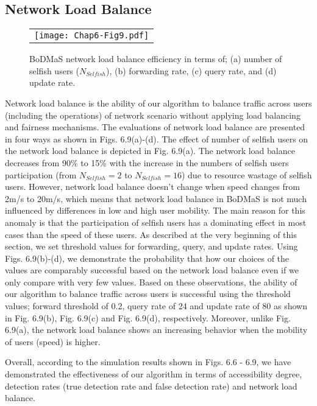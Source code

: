 \subsection{Network Load Balance}\label{Chap6_05_03}
\begin{figure}[t]
\begin{center}
  \begin{tabular}{c}
  \texttt{[image: Chap6-Fig9.pdf]}
  \end{tabular}
  \caption{BoDMaS network load balance efficiency in terms of; (a) number of selfish users ($N_{Selfish}$), (b) forwarding rate, (c) query rate, and (d) update rate.}
\end{center}
\end{figure}

Network load balance is the ability of our algorithm to balance traffic across users (including the operations) of network scenario without applying load balancing and fairness mechanisms. The evaluations of network load balance are presented in four ways as shown in Figs. 6.9(a)-(d). The effect of number of selfish users on the network load balance is depicted in Fig. 6.9(a). The network load balance decreases from 90\% to 15\% with the increase in the numbers of selfish users participation (from $N_{Selfish} = 2$ to $N_{Selfish}=16$) due to resource wastage of selfish users. However, network load balance doesn't change when speed changes from 2m/s to 20m/s, which means that network load balance in BoDMaS is not much influenced by differences in low and high user mobility. The main reason for this anomaly is that the participation of selfish users has a dominating effect in most cases than the speed of these users. As described at the very beginning of this section, we set threshold values for forwarding, query, and update rates. Using Figs. 6.9(b)-(d), we demonstrate the probability that how our choices of the values are comparably successful based on the network load balance even if we only compare with very few values. Based on these observations, the ability of our algorithm to balance traffic across users is successful using the threshold values; forward threshold of 0.2, query rate of 24 and update rate of 80 as shown in Fig. 6.9(b), Fig. 6.9(c) and Fig. 6.9(d), respectively. Moreover, unlike Fig. 6.9(a), the network load balance shows an increasing behavior when the mobility of users (speed) is higher.

Overall, according to the simulation results shown in Figs. 6.6 - 6.9, we have demonstrated the effectiveness of our algorithm in terms of accessibility degree, detection rates (true detection rate and false detection rate) and network load balance.

